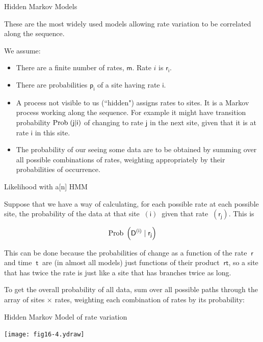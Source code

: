 \documentclass[bluish,slideColor,colorBG,pdf]{prosper}
\def\Prob{{\rm Prob\;}}
\begin{document}
\begin{slide}[Replace]{Hidden Markov Models}
\bigskip

These are the most widely used models allowing rate variation to be
correlated along the sequence.
\bigskip

We assume:
\begin{itemize}
\item There are a finite number of rates, $\mathsf{m}$.  Rate $i$ is $\mathsf{r_i}$.
\item There are probabilities $\mathsf{p_i}$ of a site having rate $\mathsf{i}$.
\item A process not visible to us (``hidden") assigns rates to
sites.  It is a Markov process working along the sequence.  For example
it might have transition probability $\mathsf{\Prob(j|i)}$ of changing to rate $\mathsf{j}$
in the next site, given that it is at rate $\mathsf{i}$ in this site.
\item The probability of our seeing some data are to be obtained by
summing over all possible combinations of rates, weighting appropriately
by their probabilities of occurrence.
\end{itemize}

\end{slide}

\begin{slide}[Replace]{Likelihood with a[n] HMM}
\bigskip

Suppose that we have a way of calculating, for each possible
rate at each possible site, the probability of the data at that
site $~\mathsf{(i)}~$ given that rate $~\mathsf{(r_j)}$.  This is

\[
\mathsf{\Prob\left(D^{(i)}\;|\;r_j\right)}
\]

This can be done because the probabilities of change as a function of
the rate $~\mathsf{r}~$ and time $~\mathsf{t}~$ are (in almost all
models) just functions of their product $~\mathsf{rt}$, so a site that
has twice the rate is just like a site that has branches twice as long.
\bigskip

To get the overall probability of all data, sum over all
possible paths through the array of sites $\mathsf{\times}$ rates,
weighting each combination of rates by its probability:

\end{slide}


\begin{slide}[Replace]{Hidden Markov Model of rate variation}

\centerline{\texttt{[image: fig16-4.ydraw]}}

\end{slide}
\end{document}
